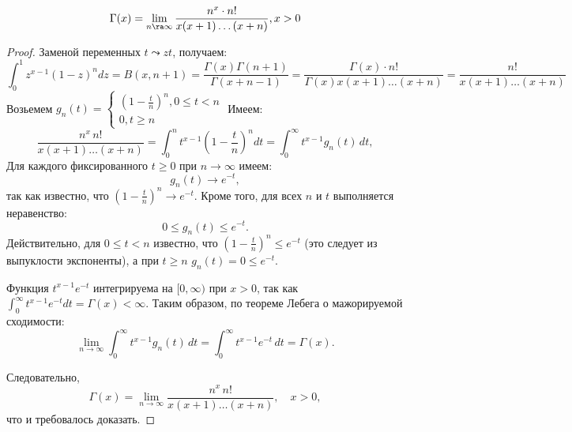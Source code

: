 \begin{corollary}
    \[\Gamma(x) = \lim_{n \ra \infty} \frac{n^x\cdot n!}{x(x + 1)\dots(x + n)}, x > 0\]
\end{corollary}
\begin{proof}
    Заменой переменных \(t \leadsto zt\), получаем:
    \[\int_0^1 z^{x - 1}(1 - z)^ndz = B(x, n + 1) = \frac{\Gamma(x)\Gamma(n + 1)}{\Gamma(x + n - 1)} = \frac{\Gamma(x)\cdot n!}{\Gamma(x)x(x + 1)\dots (x + n)} = \frac{n!}{x(x + 1)\dots (x + n)}\]
    Возьемем \(g_n(t) = \left\{\begin{array}{l}
        \left( 1 - \frac{t}{n} \right)^n, 0 \le t < n \\
        0, t \ge n
    \end{array}\right.\)
    Имеем:
    \[\frac{n^x\, n!}{x(x+1)\dots(x+n)} = \int_0^n t^{x-1}\left(1-\frac{t}{n}\right)^n dt = \int_0^{\infty} t^{x-1} g_n(t)\,dt,\]
    Для каждого фиксированного \(t\ge0\) при \(n\to\infty\) имеем:
    \[g_n(t) \to e^{-t},\]
    так как известно, что \(\left(1-\frac{t}{n}\right)^n \to e^{-t}\). Кроме того, для всех \(n\) и \(t\) выполняется неравенство:
    \[0 \le g_n(t) \le e^{-t}.\]
    Действительно, для \(0\le t<n\) известно, что \(\left(1-\frac{t}{n}\right)^n \le e^{-t}\) (это следует из выпуклости экспоненты), а при \(t\ge n\) \(g_n(t)=0\le e^{-t}\). 

    Функция \(t^{x-1}e^{-t}\) интегрируема на \([0,\infty)\) при \(x>0\), так как \(\int_0^{\infty}t^{x-1}e^{-t}dt = \Gamma(x)<\infty\). Таким образом, по теореме Лебега о мажорируемой сходимости:
    \[\lim_{n\to\infty}\int_0^{\infty} t^{x-1} g_n(t)\,dt = \int_0^{\infty} t^{x-1} e^{-t}\,dt = \Gamma(x).\]

    Следовательно,
    \[\Gamma(x) = \lim_{n\to\infty} \frac{n^x\, n!}{x(x+1)\dots(x+n)},\quad x>0,\]
    что и требовалось доказать.
\end{proof}


